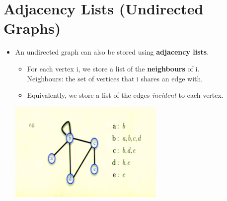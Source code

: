 \documentclass[12pt]{article}
\begin{document}
\section{Adjacency Lists (Undirected Graphs)}
\renewcommand{\labelitemii}{$\circ$}
\renewcommand{\labelitemiii}{$\cdot$}
\renewcommand{\labelitemiii}{$\rightarrow$}
\renewcommand{\labelitemiv}{$\star$}
\begin{itemize}
\item An undirected graph can also be stored using \textbf{adjacency lists}.
	\begin{itemize}
	\item For each vertex i, we store a list of the \textbf{neighbours} of i.\\
	Neighbours: the set of vertices that i shares an edge with.
	\item Equivalently, we store a list of the edges \textit{incident} to each vertex.
	\end{itemize}
\begin{center}
	\includegraphics{lecture75}
	\end{center}
\end{itemize}
\end{document}
